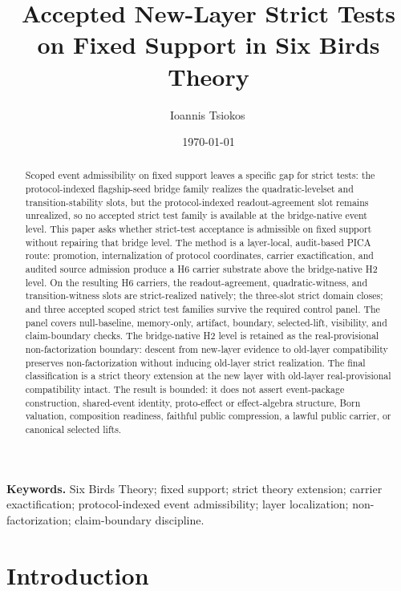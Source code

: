 \documentclass[11pt]{article}
\title{Accepted New-Layer Strict Tests on Fixed Support in Six Birds Theory}
\author{Ioannis Tsiokos\,\orcidlink{0009-0009-7659-5964}}
\date{\today}
\newcommand{\OldLayer}{H2}
\newcommand{\NewLayer}{H6}
\newcommand{\AcceptedTestCount}{three}
\newcommand{\OldLayerStatus}{real-provisional non-factorization boundary}
\theoremstyle{definition}
\begin{document}
\maketitle
\thispagestyle{firstpage}

\begin{abstract}
Scoped event admissibility on fixed support leaves a specific gap for strict
tests: the protocol-indexed flagship-seed bridge family realizes the
quadratic-levelset and transition-stability slots, but the
protocol-indexed readout-agreement slot remains unrealized, so no accepted
strict test family is available at the bridge-native event level.  This paper
asks whether strict-test acceptance is admissible on fixed support without
repairing that bridge level.  The method is a layer-local, audit-based PICA
route: promotion, internalization of protocol coordinates, carrier
exactification, and audited source admission produce a \NewLayer{} carrier
substrate above the bridge-native \OldLayer{} level.  On the resulting
\NewLayer{} carriers, the readout-agreement, quadratic-witness, and
transition-witness slots are strict-realized natively; the three-slot strict
domain closes; and \AcceptedTestCount{} accepted scoped strict test families
survive the required control panel.  The panel covers null-baseline,
memory-only, artifact, boundary, selected-lift, visibility, and claim-boundary
checks.  The bridge-native \OldLayer{} level is
retained as the \OldLayerStatus{}: descent from new-layer evidence to
old-layer compatibility preserves non-factorization without inducing
old-layer strict realization.  The final classification is a strict theory
extension at the new layer with old-layer real-provisional compatibility
intact.  The result is bounded: it does not assert event-package construction,
shared-event identity, proto-effect or effect-algebra structure, Born
valuation, composition readiness, faithful public compression, a lawful public
carrier, or canonical selected lifts.
\end{abstract}

\medskip
\noindent\textbf{Keywords.} Six Birds Theory; fixed support; strict theory extension; carrier exactification; protocol-indexed event admissibility; layer localization; non-factorization; claim-boundary discipline.

\section{Introduction}\label{sec:intro}
\end{document}
